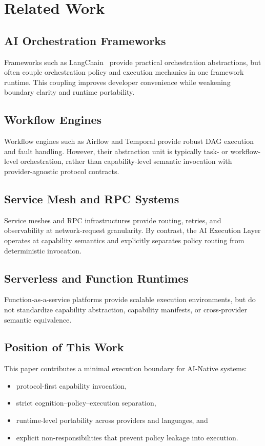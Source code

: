 \section{Related Work}

\subsection{AI Orchestration Frameworks}

Frameworks such as LangChain~\cite{langchain_docs} provide practical orchestration abstractions, but often couple orchestration policy and execution mechanics in one framework runtime. This coupling improves developer convenience while weakening boundary clarity and runtime portability.

\subsection{Workflow Engines}

Workflow engines such as Airflow and Temporal provide robust DAG execution and fault handling. However, their abstraction unit is typically task- or workflow-level orchestration, rather than capability-level semantic invocation with provider-agnostic protocol contracts.

\subsection{Service Mesh and RPC Systems}

Service meshes and RPC infrastructures provide routing, retries, and observability at network-request granularity. By contrast, the AI Execution Layer operates at capability semantics and explicitly separates policy routing from deterministic invocation.

\subsection{Serverless and Function Runtimes}

Function-as-a-service platforms provide scalable execution environments, but do not standardize capability abstraction, capability manifests, or cross-provider semantic equivalence.

\subsection{Position of This Work}

This paper contributes a minimal execution boundary for AI-Native systems:
\begin{itemize}[leftmargin=*,nosep]
  \item protocol-first capability invocation,
  \item strict cognition--policy--execution separation,
  \item runtime-level portability across providers and languages, and
  \item explicit non-responsibilities that prevent policy leakage into execution.
\end{itemize}

